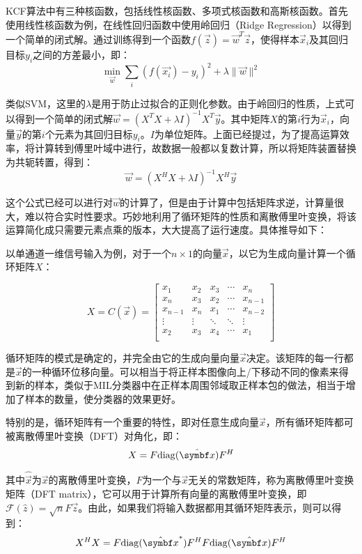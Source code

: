   KCF算法中有三种核函数，包括线性核函数、多项式核函数和高斯核函数。首先使用线性核函数为例，在线性回归函数中使用岭回归（Ridge Regression）以得到一个简单的闭式解。通过训练得到一个函数$f(\vec{z})=\vec{w}^T\vec{z}$，使得样本$\vec{x}_i$及其回归目标$y_i$之间的方差最小，即：
$$\min_{\vec{w}}\sum_i (f(\vec{x_i})-y_i)^2+\lambda \lVert\vec{w}\rVert^2$$

  类似SVM，这里的$\lambda$是用于防止过拟合的正则化参数。由于岭回归的性质，上式可以得到一个简单的闭式解$\vec{w}=(X^TX+\lambda I)^{-1}X^T\vec{y}$。其中矩阵$X$的第$i$行为$\vec{x}_i$，向量$\vec{y}$的第$i$个元素为其回归目标$y_i$。$I$为单位矩阵。上面已经提过，为了提高运算效率，将计算转到傅里叶域中进行，故数据一般都以复数计算，所以将矩阵装置替换为共轭转置，得到：
$$\vec{w}=(X^HX+\lambda I)^{-1}X^H\vec{y}$$

  这个公式已经可以进行对$\vec{w}$的计算了，但是由于计算中包括矩阵求逆，计算量很大，难以符合实时性要求。\citet{henriques2015high}巧妙地利用了循环矩阵的性质和离散傅里叶变换，将该运算简化成只需要元素点乘的版本，大大提高了运行速度。具体推导如下：

  以单通道一维信号输入为例，对于一个$n\times1$的向量$\vec{x}$，以它为生成向量计算一个循环矩阵$X$：

$$
X = C(\vec{x}) =
\left[
\begin{matrix}
 x_1      & x_2      & x_3      & \cdots & x_n     \\
 x_n      & x_3      & x_2      & \cdots & x_{n-1} \\
 x_{n-1}  & x_n      & x_1      & \cdots & x_{n-2} \\
 \vdots   & \vdots   & \ddots   & \ddots & \vdots  \\
 x_2      & x_3      & x_4      & \cdots & x_1     \\
\end{matrix}
\right]
$$

  循环矩阵的模式是确定的，并完全由它的生成向量向量$\vec{x}$决定。该矩阵的每一行都是$\vec{x}$的一种循环位移向量。可以相当于将正样本图像向上/下移动不同的像素来得到新的样本，类似于MIL分类器中在正样本周围邻域取正样本包的做法，相当于增加了样本的数量，使分类器的效果更好。

  特别的是，循环矩阵有一个重要的特性，即对任意生成向量$\vec{x}$，所有循环矩阵都可被离散傅里叶变换（DFT）对角化，即：
$$X = F {\rm diag}(\hat{\vec{x}}) F^H$$

  其中$\hat{\vec{x}}$为$\vec{x}$的离散傅里叶变换，$F$为一个与$\vec{x}$无关的常数矩阵，称为离散傅里叶变换矩阵（DFT matrix），它可以用于计算所有向量的离散傅里叶变换，即$\mathcal{F}(\hat{z})=\sqrt{n}F\vec{z}$。由此，如果我们将输入数据都用其循环矩阵表示，则可以得到：
$$X^HX = F {\rm diag}(\hat{\vec{x}}^\ast)F^H F {\rm diag}(\hat{\vec{x}})F^H$$

